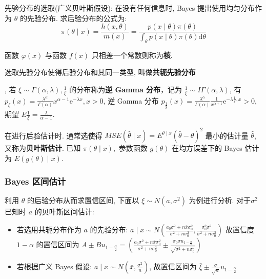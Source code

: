 \documentclass[10pt]{yerbaformat}
\begin{document}
\par 先验分布的选取(广义贝叶斯假设): 在没有任何信息时, Bayes 提出使用均匀分布作为 $\theta$ 的先验分布. 求后验分布的公式为: $$\pi(\theta \mid x)=\frac{h(x, \theta)}{m(x)}=\frac{p(x \mid \theta) \pi(\theta)}{\int_{\theta} p(x \mid \theta) \pi(\theta) \mathrm{d} \theta}$$

\begin{definition}
    函数 $\varphi(x)$ 与函数 $f(x)$ 只相差一个常数则称为\textbf{核}.
\end{definition}

\begin{definition}
    选取先验分布使得后验分布和其同一类型, 叫做\textbf{共轭先验分布}
\end{definition}

\par , 若 $\xi \sim \Gamma(\alpha, \lambda), \frac{1}{\xi}$ 的分布称为\textbf{逆 Gamma 分布}，记为 $\frac{1}{\xi} \sim I \Gamma(\alpha, \lambda)$, 有 $p_{\xi}(x)=\frac{\lambda^{\alpha}}{\Gamma(\alpha)} x^{\alpha-1} \mathrm{e}^{-\lambda x}, x>0$, 逆 Gamma 分布
$p_{\frac{1}{\xi}}(x)=\frac{\lambda^{\alpha}}{\Gamma(\alpha)} \frac{1}{x^{\alpha+1}} \mathrm{e}^{-\lambda \frac{1}{x}, x}>0$, 期望 $E \frac{1}{\xi}=\frac{\lambda}{\alpha-1}$.

\par 在进行后验估计时. 通常选使得 $MSE(\hat{\theta} \mid x)=E^{\theta \mid x}(\hat{\theta}-\theta)^{2}$ 最小的估计量 $\hat{\theta}$, 又称为\textbf{贝叶斯估计}. 已知 $\pi(\theta \mid x),$ 参数函数 $g(\theta)$ 在均方误差下的 Bayes 估计为 $E(g(\theta) \mid x)$.

\subsubsection{Bayes 区间估计}

\par 利用 $\theta$ 的后验分布从而求置信区间, 下面以 $\xi \sim N\left(a, \sigma^{2}\right)$ 为例进行分析. 对于$\sigma^{2}$ 已知时 $a$ 的贝叶斯区间估计:

\begin{itemize}
    \item 若选用共轭分布作为 $a$ 的先验分布: $a \mid x \sim N\left(\frac{a_{0} \sigma^{2}+n \bar{x} \sigma_{0}^{2}}{\sigma^{2}+n \sigma_{0}^{2}}, \frac{\sigma_{0}^{2} \sigma^{2}}{\sigma^{2}+n \sigma_{0}^{2}}\right)$ 故置信度 $1-\alpha$ 的置信区间为 $A \pm B u_{1-\frac{\alpha}{2}}=\left(\frac{a_{0} \sigma^{2}+n \bar{x} \sigma_{0}^{2}}{\sigma^{2}+n \sigma_{0}^{2}} \pm \frac{\sigma_{0} \sigma u_{1-\frac{\alpha}{2}}}{\sqrt{\sigma^{2}+n \sigma_{0}^{2}}}\right)$
    \item 若根据广义 Bayes 假设: $a \mid x \sim N\left(\bar{x}, \frac{\sigma^{2}}{n}\right)$, 故置信区间为 $\bar{\xi} \pm \frac{\sigma}{\sqrt{n}} u_{1-\frac{\alpha}{2}}$
\end{itemize}
\end{document}
